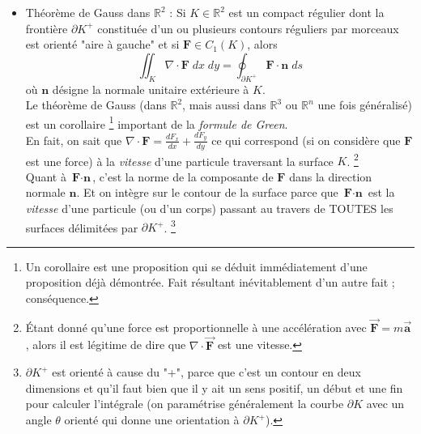 \documentclass[a4paper]{article}
\begin{document}
\begin{itemize}
\item Théorème de Gauss dans $ \mathbb{R}^2 $ : Si $ K \in \mathbb{R}^2 $ est un compact régulier dont la frontière $ \partial K^+ $ constituée d'un ou plusieurs contours réguliers par morceaux est orienté "aire à gauche" et si $ \textbf{F} \in C_1(K) $, alors 
\[ \iint_K \nabla \cdot \textbf{F} \; d x \; d y = \oint_{\partial K^+} \textbf{F} \cdot \textbf{n} \; d s \]
où $ \textbf{n} $ désigne la normale unitaire extérieure à $ K $. \\
Le théorème de Gauss (dans $ \mathbb{R}^2 $, mais aussi dans $ \mathbb{R}^3 $ ou $ \mathbb{R}^n $ une fois généralisé) est un corollaire \footnote{Un corollaire est une proposition qui se déduit immédiatement d'une proposition déjà démontrée. Fait résultant inévitablement d'un autre fait ; conséquence.} important de la \emph{formule de Green}. \\
En fait, on sait que $ \nabla \cdot \textbf{F} = \frac{d F_x}{d x} + \frac{d F_y}{d y} $ ce qui correspond (si on considère que $ \textbf{F} $ est une force) à la \emph{vitesse} d'une particule traversant la surface $ K $. \footnote{Étant donné qu'une force est proportionnelle à une accélération avec $ \vec{\textbf{F}} = m \vec{\textbf{a}} $, alors il est légitime de dire que $ \nabla \cdot \vec{\textbf{F}} $ est une vitesse.} \\
Quant à $ \textbf{F} \cdot \textbf{n} $, c'est la norme de la composante de $ \textbf{F} $ dans la direction normale $ \textbf{n} $. Et on intègre sur le contour de la surface parce que $ \textbf{F} \cdot \textbf{n} $ est la \emph{vitesse} d'une particule (ou d'un corps) passant au travers de TOUTES les surfaces délimitées par $ \partial K^+ $. \footnote{$ \partial K^+ $ est orienté à cause du "+", parce que c'est un contour en deux dimensions et qu'il faut bien que il y ait un sens positif, un début et une fin pour calculer l'intégrale (on paramétrise généralement la courbe $ \partial K $ avec un angle $ \theta $ orienté qui donne une orientation à $ \partial K^+ $).}







\end{itemize}
\end{document}
